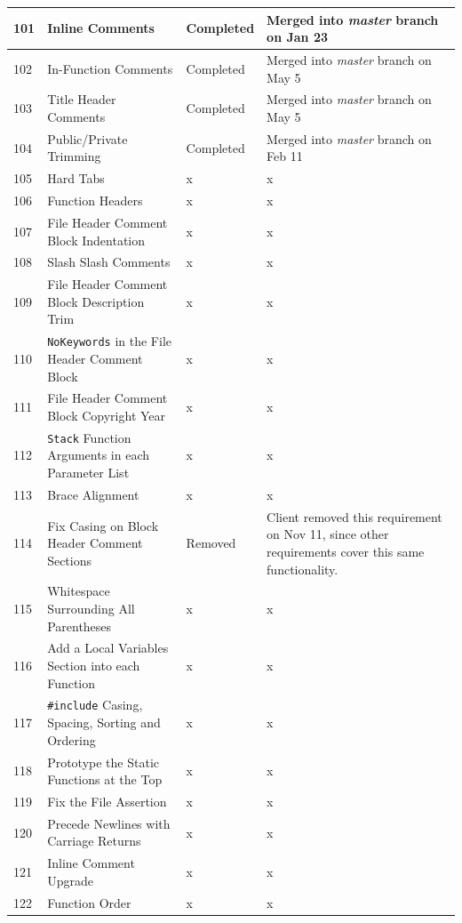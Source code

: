 \documentclass[11pt]{scrreprt}
\begin{document}
\noindent\begin{longtable}{| p{} | p{} | p{} | p{} |}
\hline
101 & Inline Comments & Completed & Merged into \textit{master} branch on Jan 23\\
\hline
102 & In-Function Comments & Completed & Merged into \textit{master} branch on May 5\\
\hline
103 & Title Header Comments & Completed & Merged into \textit{master} branch on May 5\\
\hline
104 & Public/Private Trimming & Completed & Merged into \textit{master} branch on Feb 11\\
\hline
105 & Hard Tabs & x & x\\
\hline
106 & Function Headers & x & x\\
\hline
107 & File Header Comment Block Indentation & x & x\\
\hline
108 & Slash Slash Comments & x & x\\
\hline
109 & File Header Comment Block Description Trim & x & x\\
\hline
110 & \texttt{NoKeywords} in the File Header Comment Block & x & x\\
\hline
111 & File Header Comment Block Copyright Year & x & x\\
\hline
112 & \texttt{Stack} Function Arguments in each Parameter List & x & x\\
\hline
113 & Brace Alignment & x & x\\
\hline
114 & Fix Casing on Block Header Comment Sections & Removed & Client removed this requirement on Nov 11, since other requirements cover this same functionality.\\
\hline
115 & Whitespace Surrounding All Parentheses & x & x\\
\hline
116 & Add a Local Variables Section into each Function & x & x\\
\hline
117 & \texttt{\#include} Casing, Spacing, Sorting and Ordering & x & x\\
\hline
118 & Prototype the Static Functions at the Top & x & x\\
\hline
119 & Fix the File Assertion & x & x\\
\hline
120 & Precede Newlines with Carriage Returns & x & x\\
\hline
121 & Inline Comment Upgrade & x & x\\
\hline
122 & Function Order & x & x\\
\hline
\end{longtable}
\end{document}
